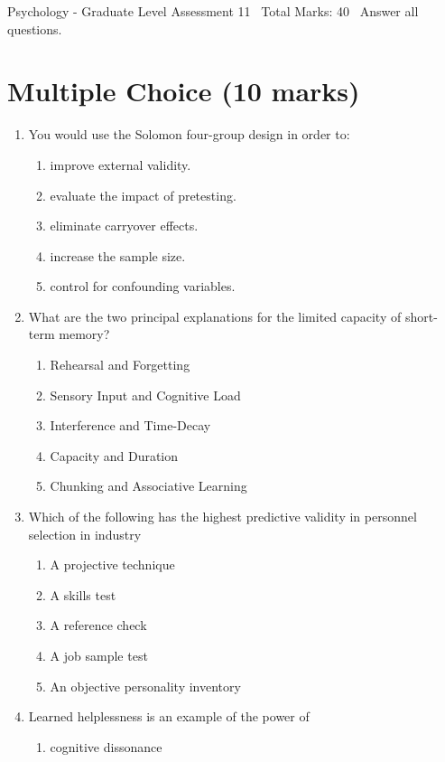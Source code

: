 \documentclass[12pt]{article}
\begin{document}
\begin{center}
Psychology - Graduate Level Assessment 11 \
Total Marks: 40 \
Answer all questions.
\end{center}

\section*{Multiple Choice (10 marks)}
\begin{enumerate}[label=\arabic*.]
\item You would use the Solomon four-group design in order to:
\begin{enumerate}[label=(\alph*)]
    \item improve external validity.
    \item evaluate the impact of pretesting.
    \item eliminate carryover effects.
    \item increase the sample size.
    \item control for confounding variables.
\end{enumerate}
\item What are the two principal explanations for the limited capacity of short-term memory?
\begin{enumerate}[label=(\alph*)]
    \item Rehearsal and Forgetting
    \item Sensory Input and Cognitive Load
    \item Interference and Time-Decay
    \item Capacity and Duration
    \item Chunking and Associative Learning
\end{enumerate}
\item Which of the following has the highest predictive validity in personnel selection in industry
\begin{enumerate}[label=(\alph*)]
    \item A projective technique
    \item A skills test
    \item A reference check
    \item A job sample test
    \item An objective personality inventory
\end{enumerate}
\item Learned helplessness is an example of the power of
\begin{enumerate}[label=(\alph*)]
    \item cognitive dissonance

\end{enumerate}
\end{enumerate}
\end{document}
